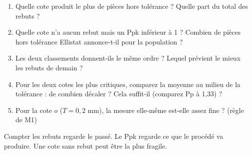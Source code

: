 \documentclass[10pt,a4paper]{article}
\begin{document}
\par
\newpage
{}
\begin{enumerate}[label=\textcolor{cyan}{\textbf{Q\arabic*.}},leftmargin=22pt]
\item Quelle cote produit le plus de pièces hors tolérance ? Quelle part du total des rebuts ?\reponse[1]
\item Quelle cote n'a aucun rebut mais un Ppk inférieur à 1 ? Combien de pièces hors tolérance Ellistat annonce-t-il pour la population ?\reponse[2]
\item Les deux classements donnent-ils le même ordre ? Lequel prévient le mieux les rebuts de demain ?\reponse[2]
\item Pour les deux cotes les plus critiques, comparez la moyenne au milieu de la tolérance : de combien décaler ? Cela suffit-il (comparez Pp à 1,33) ?\reponse[2]
\item Pour la cote $o$ ($T = 0{,}2$ mm), la mesure elle-même est-elle assez fine ? (règle de M1)\reponse[1]
\end{enumerate}
\begin{tcolorbox}[retenir]Compter les rebuts regarde le passé. Le Ppk regarde ce que le procédé va produire. Une cote sans rebut peut être la plus fragile.\end{tcolorbox}
\providecommand{\carre}{\fbox{\rule{0pt}{1.1ex}\rule{1.1ex}{0pt}}}
\end{document}

